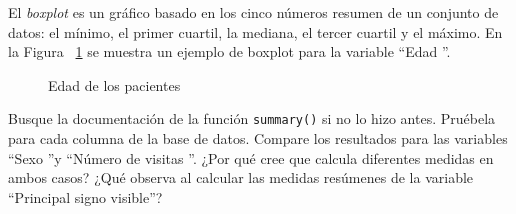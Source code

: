\documentclass{../prob}
\begin{document}
	\begin{problema}
	El \textit{boxplot} es un gráfico basado en los cinco números resumen de un conjunto de datos: el mínimo, el primer cuartil, la mediana, el tercer cuartil y el máximo. En la Figura ~\ref{fig:boxplot} se muestra un ejemplo de boxplot para la variable \textquotedblleft Edad \textquotedblright .

\begin{figure}[!ht]
    \centering
    
    \caption{Edad de los pacientes}
    \label{fig:boxplot}
\end{figure}	

	\begin{parte}
	Busque la documentación de la función \texttt{summary()} si no lo hizo antes. Pruébela para cada columna de la base de datos. Compare los resultados para las variables \textquotedblleft Sexo \textquotedblright y \textquotedblleft Número de visitas \textquotedblright . ¿Por qué cree que calcula diferentes medidas en ambos casos? ¿Qué observa al calcular las medidas resúmenes de la variable \textquotedblleft Principal signo visible\textquotedblright ?\\
	
		\noindent{}\\
	
	\end{parte}	
	

\end{problema}
\end{document}
